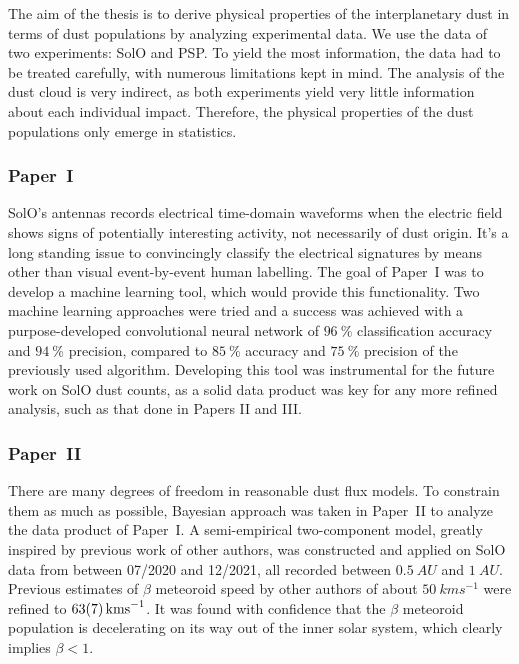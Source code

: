 The aim of the thesis is to derive physical properties of the interplanetary dust in terms of dust populations by analyzing experimental data. We use the data of two experiments: SolO and PSP. To yield the most information, the data had to be treated carefully, with numerous limitations kept in mind. The analysis of the dust cloud is very indirect, as both experiments yield very little information about each individual impact. Therefore, the physical properties of the dust populations only emerge in statistics. 

\subsubsection{Paper~I}

SolO's antennas records electrical time-domain waveforms when the electric field shows signs of potentially interesting activity, not necessarily of dust origin. It's a long standing issue to convincingly classify the electrical signatures by means other than visual event-by-event human labelling. The goal of Paper~I was to develop a machine learning tool, which would provide this functionality. Two machine learning approaches were tried and a success was achieved with a purpose-developed convolutional neural network of $\SI{96}{\%}$ classification accuracy and $\SI{94}{\%}$ precision, compared to $\SI{85}{\%}$ accuracy and $\SI{75}{\%}$ precision of the previously used algorithm. Developing this tool was instrumental for the future work on SolO dust counts, as a solid data product was key for any more refined analysis, such as that done in Papers II and III. 

\subsubsection{Paper~II}

There are many degrees of freedom in reasonable dust flux models. To constrain them as much as possible, Bayesian approach was taken in Paper~II to analyze the data product of Paper~I. A semi-empirical two-component model, greatly inspired by previous work of other authors, was constructed and applied on SolO data from between 07/2020 and 12/2021, all recorded between $\SI{0.5}{AU}$ and $\SI{1}{AU}$. Previous estimates of $\beta$ meteoroid speed by other authors of about $\SI{50}{kms^{-1}}$ were refined to $\SI{63 \pm 7}{kms^{-1}}$. It was found with confidence that the $\beta$ meteoroid population is decelerating on its way out of the inner solar system, which clearly implies $\beta < 1$. 

